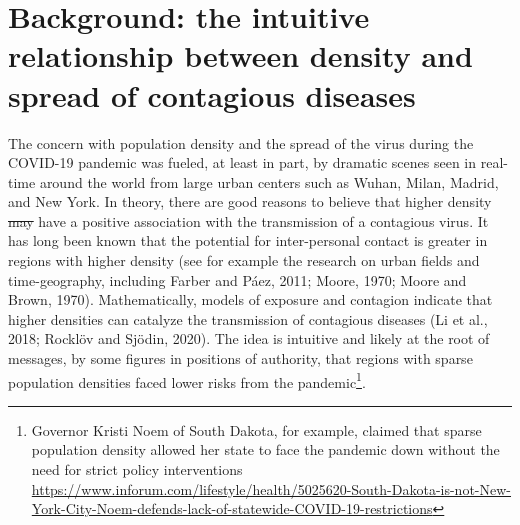 \documentclass[]{elsarticle} %
\providecommand{\DIFaddtex}[1]{{\protect\color{blue}\uwave{#1}}} %
\providecommand{\DIFdeltex}[1]{{\protect\color{red}\sout{#1}}}                      %
\providecommand{\DIFaddbegin}{} %
\providecommand{\DIFaddend}{} %
\providecommand{\DIFdelbegin}{} %
\providecommand{\DIFdelend}{} %
\providecommand{\DIFadd}[1]{\texorpdfstring{\DIFaddtex{#1}}{#1}} %
\providecommand{\DIFdel}[1]{\texorpdfstring{\DIFdeltex{#1}}{}} %
\newcommand{\DIFscaledelfig}{0.5}
\newlength{\DIFdelgraphicswidth} %
\newlength{\DIFdelgraphicsheight} %
\newcommand{\DIFaddincludegraphics}[2][]{{\color{blue}\fbox{\DIFOincludegraphics[#1]{#2}}}} %
\newcommand{\DIFdelincludegraphics}[2][]{%
\sbox{\DIFdelgraphicsbox}{\DIFOincludegraphics[#1]{#2}}%
\settoboxwidth{\DIFdelgraphicswidth}{\DIFdelgraphicsbox} %
\settoboxtotalheight{\DIFdelgraphicsheight}{\DIFdelgraphicsbox} %
\scalebox{\DIFscaledelfig}{%
\parbox[b]{\DIFdelgraphicswidth}{\usebox{\DIFdelgraphicsbox}\\[-\baselineskip] \rule{\DIFdelgraphicswidth}{0em}}\llap{\resizebox{\DIFdelgraphicswidth}{\DIFdelgraphicsheight}{%
\setlength{\unitlength}{\DIFdelgraphicswidth}%
\begin{picture}(1,1)%
\thicklines\linethickness{2pt} %
{\color[rgb]{1,0,0}\put(0,0){\framebox(1,1){}}}%
{\color[rgb]{1,0,0}\put(0,0){\line( 1,1){1}}}%
{\color[rgb]{1,0,0}\put(0,1){\line(1,-1){1}}}%
\end{picture}%
}\hspace*{3pt}}} %
} %
\DeclareRobustCommand{\DIFaddbegin}{\DIFOaddbegin \let\includegraphics\DIFaddincludegraphics} %
\DeclareRobustCommand{\DIFaddend}{\DIFOaddend \let\includegraphics\DIFOincludegraphics} %
\DeclareRobustCommand{\DIFdelbegin}{\DIFOdelbegin \let\includegraphics\DIFdelincludegraphics} %
\DeclareRobustCommand{\DIFdelend}{\DIFOaddend \let\includegraphics\DIFOincludegraphics} %
\begin{document}
\hypertarget{background-the-intuitive-relationship-between-density-and-spread-of-contagious-diseases}{%
\section{Background: the intuitive relationship between density and
spread of contagious
diseases}\label{background-the-intuitive-relationship-between-density-and-spread-of-contagious-diseases}}

The concern with population density and the spread of the virus during
the COVID-19 pandemic was fueled, at least in part, by dramatic scenes
seen in real-time around the world from large urban centers such as
Wuhan, Milan, Madrid, and New York. In theory, there are good reasons to
believe that higher density \DIFdelbegin \DIFdel{may }\DIFdelend \DIFaddbegin \DIFadd{could }\DIFaddend have a positive association with the
transmission of a contagious virus. It has long been known that the
potential for inter-personal contact is greater in regions with higher
density (see for example the research on urban fields and
time-geography, including Farber and Páez, 2011; Moore, 1970; Moore and
Brown, 1970). Mathematically, models of exposure and contagion indicate
that higher densities can catalyze the transmission of contagious
diseases (Li et al., 2018; Rocklöv and Sjödin, 2020). The idea is
intuitive and likely at the root of messages, by some figures in
positions of authority, that regions with sparse population densities
faced lower risks from the pandemic\footnote{Governor Kristi Noem of
  South Dakota, for example, claimed that sparse population density
  allowed her state to face the pandemic down without the need for
  strict policy interventions
  \url{https://www.inforum.com/lifestyle/health/5025620-South-Dakota-is-not-New-York-City-Noem-defends-lack-of-statewide-COVID-19-restrictions}}.
\end{document}
